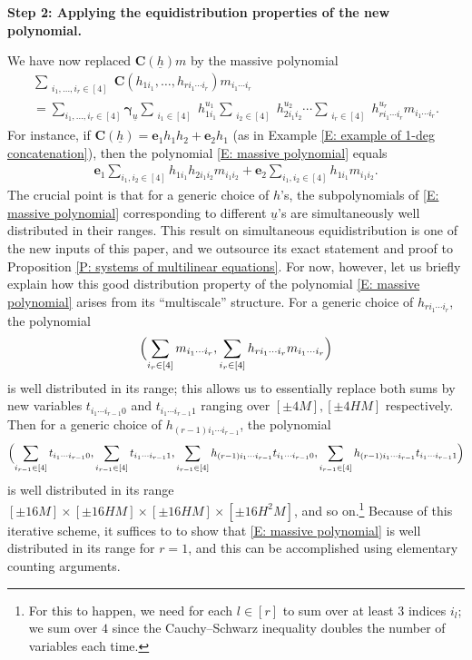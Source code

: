 \documentclass[11pt]{amsart}
\theoremstyle{definition}
\newcommand{\bc}{{\textbf{C}}}
\newcommand{\be}{{\mathbf{e}}}
\newcommand{\bgamma}{{\boldsymbol{\gamma}}}
\newcommand{\uh}{{\underline{h}}}
\newcommand{\uu}{{\underline{u}}}
\newcommand{\Bigbrac}[1]{\Bigl( #1 \Bigr)}
\begin{document}
\smallskip
\textbf{Step 2: Applying the equidistribution properties of the new polynomial.}
\smallskip

We have now replaced $\bc(\uh)m$ by the massive polynomial 
\begin{multline}\label{E: massive polynomial}
    \sum_{\substack{i_1, \ldots, i_r\in [4]}}\bc(h_{1i_1}, \ldots, h_{ri_1\cdots  i_r})m_{i_1\cdots  i_r}\\
    = \sum_{i_1, \ldots, i_r\in[4]}\bgamma_\uu \sum_{\substack{i_1\in[4]}}h_{1i_1}^{u_1}
    \sum_{\substack{i_2\in[4]}}h_{2i_1i_2}^{u_2}\cdots \sum_{\substack{i_r\in[4]}} h_{ri_1\cdots  i_r}^{u_{r}} m_{i_1\cdots  i_r}.
\end{multline}
For instance, if $\bc(\uh) = \be_1  h_1 h_2+\be_2 h_1$ (as in Example \ref{E: example of 1-deg concatenation}), then the polynomial \eqref{E: massive polynomial} equals
\begin{align*}
    \be_1\sum_{i_1, i_2\in[4]}h_{1i_1}h_{2i_1i_2}m_{i_1i_2} +\be_2\sum_{i_1, i_2\in[4]}h_{1i_1}m_{i_1i_2}.
\end{align*}
The crucial point is that for a generic choice of $h$'s, the subpolynomials of \eqref{E: massive polynomial} corresponding to different $\uu$'s are simultaneously well distributed in their ranges.
This result on simultaneous equidistribution is one of the new inputs of this paper, and we outsource its exact statement and proof to Proposition \ref{P: systems of multilinear equations}. For now, however, let us briefly explain how this good distribution property of the polynomial \eqref{E: massive polynomial} arises from its ``multiscale'' structure. For a generic choice of $h_{ri_1\cdots  i_r}$, the polynomial $$\Bigbrac{\sum_{\substack{i_r\in[4]}} m_{i_1\cdots  i_r}, \sum_{\substack{i_r\in[4]}} h_{ri_1\cdots  i_r} m_{i_1\cdots  i_r}}$$ is well distributed in its range; this allows us to essentially replace both sums by new variables $t_{i_1\cdots  i_{r-1}0}$ and $t_{i_1\cdots  i_{r-1}1}$ ranging over $[\pm 4 M], [\pm 4HM]$ respectively. 
Then for a generic choice of $h_{(r-1)i_1\cdots i_{r-1}}$, the polynomial
\begin{align*}
    \Bigbrac{\sum_{i_{r-1}\in[4]}t_{i_1\cdots  i_{r-1}0}, \sum_{i_{r-1}\in[4]}t_{i_1\cdots  i_{r-1}1}, \sum_{i_{r-1}\in[4]}h_{(r-1)i_1\cdots  i_{r-1}} t_{i_1\cdots  i_{r-1}0}, \sum_{i_{r-1}\in[4]}h_{(r-1)i_1\cdots  i_{r-1}} t_{i_1\cdots  i_{r-1}1}}    
\end{align*}
 is well distributed in its range $[\pm 16 M]
\times [\pm 16HM]\times [\pm 16HM]
\times [\pm 16H^2M]$, and so on.\footnote{For this to happen, we need for each $l\in[r]$ to sum over at least $3$ indices $i_l$; we sum over $4$ since the Cauchy--Schwarz inequality doubles the number of variables each time.}
Because of this iterative scheme, it suffices to to show that \eqref{E: massive polynomial} is well distributed in its range for $r=1$, and this can be accomplished using elementary counting arguments. 
\end{document}
